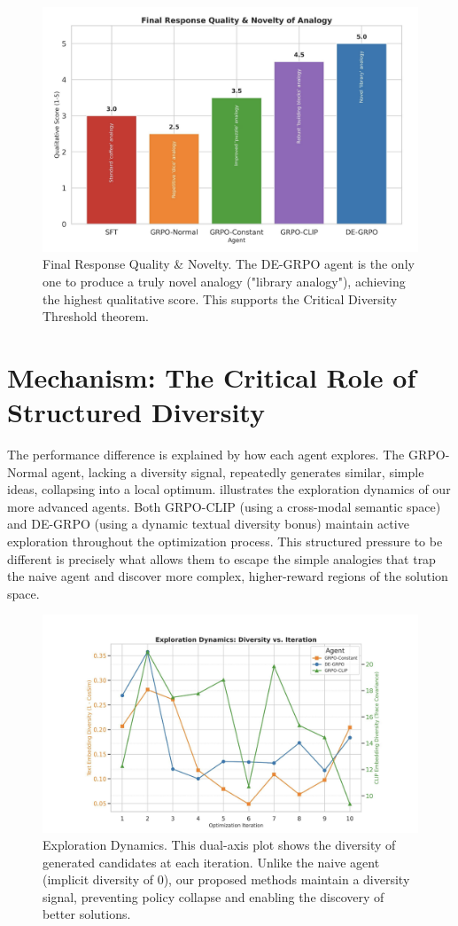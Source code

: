 \begin{figure}[htbp]
    \centering
    \includegraphics[width=0.9\linewidth]{i2.png}
    \caption{Final Response Quality \& Novelty. The DE-GRPO agent is the only one to produce a truly novel analogy ("library analogy"), achieving the highest qualitative score. This supports the Critical Diversity Threshold theorem.}
    \label{fig:quality_novelty}
\end{figure}

\section{Mechanism: The Critical Role of Structured Diversity}
The performance difference is explained by how each agent explores. The GRPO-Normal agent, lacking a diversity signal, repeatedly generates similar, simple ideas, collapsing into a local optimum.  illustrates the exploration dynamics of our more advanced agents. Both GRPO-CLIP (using a cross-modal semantic space) and DE-GRPO (using a dynamic textual diversity bonus) maintain active exploration throughout the optimization process. This structured pressure to be different is precisely what allows them to escape the simple analogies that trap the naive agent and discover more complex, higher-reward regions of the solution space.

\begin{figure}[htbp]
    \centering
    \includegraphics[width=0.9\linewidth]{i3.png}
    \caption{Exploration Dynamics. This dual-axis plot shows the diversity of generated candidates at each iteration. Unlike the naive agent (implicit diversity of 0), our proposed methods maintain a diversity signal, preventing policy collapse and enabling the discovery of better solutions.}
    \label{fig:exploration_dynamics}
\end{figure}

